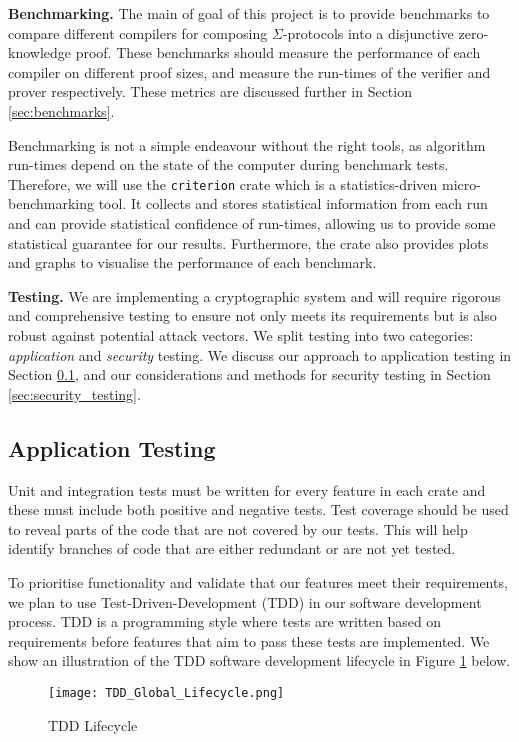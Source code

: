 \textbf{Benchmarking.} The main of goal of this project is to provide benchmarks to compare different compilers for composing $\Sigma$-protocols into a disjunctive zero-knowledge proof. These benchmarks should measure the performance of each compiler on different proof sizes, and measure the run-times of the verifier and prover respectively. These metrics are discussed further in Section \ref{sec:benchmarks}. 

Benchmarking is not a simple endeavour without the right tools, as algorithm run-times depend on the state of the computer during benchmark tests. Therefore, we will use the \texttt{criterion} crate \cite{criterion} which is a statistics-driven micro-benchmarking tool. It collects and stores statistical information from each run and can provide statistical confidence of run-times, allowing us to provide some statistical guarantee for our results. Furthermore, the crate also provides plots and graphs to visualise the performance of each benchmark.

\textbf{Testing.} We are implementing a cryptographic system and will require rigorous and comprehensive testing to ensure not only meets its requirements but is also robust against potential attack vectors. We split testing into two categories: \textit{application} and \textit{security} testing. We discuss our approach to application testing in Section \ref{sec:application_testing}, and our considerations and methods for security testing in Section \ref{sec:security_testing}.

\subsection{Application Testing}
\label{sec:application_testing}
Unit and integration tests must be written for every feature in each crate and these must include both positive and negative tests. Test coverage should be used to reveal parts of the code that are not covered by our tests. This will help identify branches of code that are either redundant or are not yet tested.

To prioritise functionality and validate that our features meet their requirements, we plan to use Test-Driven-Development (TDD) in our software development process. TDD is a programming style where tests are written based on requirements before features that aim to pass these tests are implemented. We show an illustration of the TDD software development lifecycle in Figure \ref{fig:tdd} below.

\begin{figure}[h]
    \centering
    \texttt{[image: TDD\_Global\_Lifecycle.png]}
    \caption{TDD Lifecycle \cite{Wikimedia:TDD}}
    \label{fig:tdd}
\end{figure}

